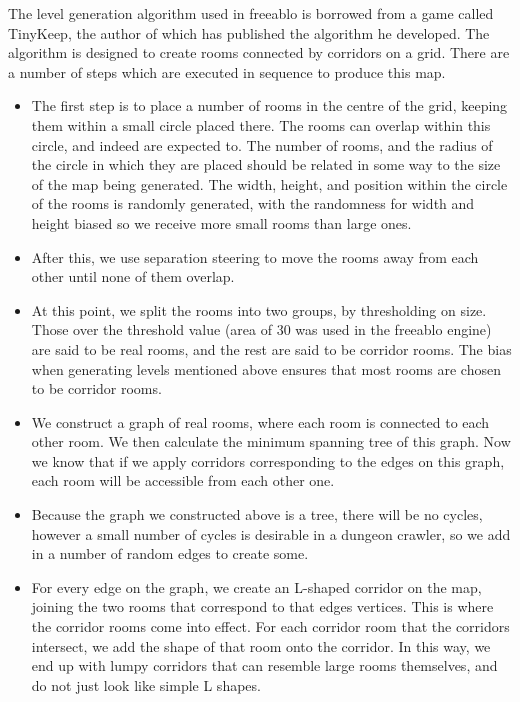     The level generation algorithm used in freeablo is borrowed from a game called TinyKeep\cite{tinykeep}, the author of which has published the algorithm he developed\cite{tinygen}.
    The algorithm is designed to create rooms connected by corridors on a grid.
    There are a number of steps which are executed in sequence to produce this map.
    \begin{itemize}
        \item
        {
            The first step is to place a number of rooms in the centre of the grid, keeping them within a small circle placed there.
            The rooms can overlap within this circle, and indeed are expected to. The number of rooms, and the radius of the circle in which they are placed
            should be related in some way to the size of the map being generated. The width, height, and position within the circle of the rooms is randomly generated, with the randomness for width and height biased so we receive more small rooms than large ones.    
        }
        \item
        {
            After this, we use separation steering to move the rooms away from each other until none of them overlap.
        }
        \item
        {
            At this point, we split the rooms into two groups, by thresholding on size. Those over the threshold value (area of 30 was used in the freeablo engine) are said to be real rooms, and the rest are said to be corridor rooms. The bias when generating levels mentioned above ensures that most rooms are chosen to be corridor rooms.
        }
        \item
        {
            We construct a graph of real rooms, where each room is connected to each other room. We then calculate the minimum spanning tree of this graph. Now we know that if we apply corridors corresponding to the edges on this graph, each room will be accessible from each other one.
        }
        \item
        {
            Because the graph we constructed above is a tree, there will be no cycles, however a small number of cycles is desirable in a dungeon crawler, so we add in a number of random edges to create some.
        }
        \item
        {
            For every edge on the graph, we create an L-shaped corridor on the map, joining the two rooms that correspond to that edges vertices.
            This is where the corridor rooms come into effect. For each corridor room that the corridors intersect, we add the shape of that room onto the corridor. In this way, we end up with lumpy corridors that can resemble large rooms themselves, and do not just look like simple L shapes.
        }
    \end{itemize}
    
